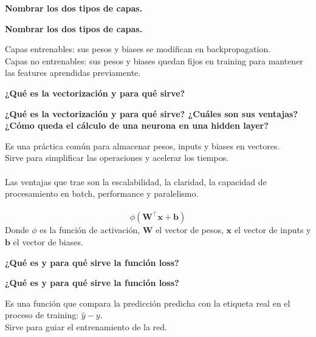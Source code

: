 \documentclass[10pt]{memoir}
\begin{document}
    \clearpage
    \begin{center}
        \textbf{\Large Nombrar los dos tipos de capas.} \\
    \end{center}

    \clearpage
    \begin{center}
        \textbf{\Large Nombrar los dos tipos de capas.} \\
    \end{center}
        Capas entrenables: sus pesos y biases se modifican en backpropagation. \\
        Capas no entrenables: sus pesos y biases quedan fijos en training para mantener las features aprendidas previamente.

    \clearpage
    \begin{center}
        \textbf{\Large ¿Qué es la vectorización y para qué sirve?} \\
    \end{center}

    \clearpage
    \begin{center}
        \textbf{\Large ¿Qué es la vectorización y para qué sirve? ¿Cuáles son sus ventajas? ¿Cómo queda el cálculo de una neurona en una hidden layer?} \\
    \end{center}
        Es una práctica común para almacenar pesos, inputs y biases en vectores. \\
        Sirve para simplificar las operaciones y acelerar los tiempos. \\
        \\
        Las ventajas que trae son la escalabilidad, la claridad, la capacidad de procesamiento en batch, performance y paralelismo. \\
        \\
        \[\phi(\mathbf{W}^{\top}\mathbf{x}+\mathbf{b})\]
        Donde $\phi$ es la función de activación, $\mathbf{W}$ el vector de pesos, $\mathbf{x}$ el vector de inputs y $\mathbf{b}$ el vector de biases.

    \clearpage
    \begin{center}
        \textbf{\Large ¿Qué es y para qué sirve la función loss?} \\
    \end{center}

    \clearpage
    \begin{center}
        \textbf{\Large ¿Qué es y para qué sirve la función loss?} \\
    \end{center}
        Es una función que compara la predicción predicha con la etiqueta real en el proceso de training: \(\hat{y}-y\). \\
        Sirve para guiar el entrenamiento de la red.
\end{document}
